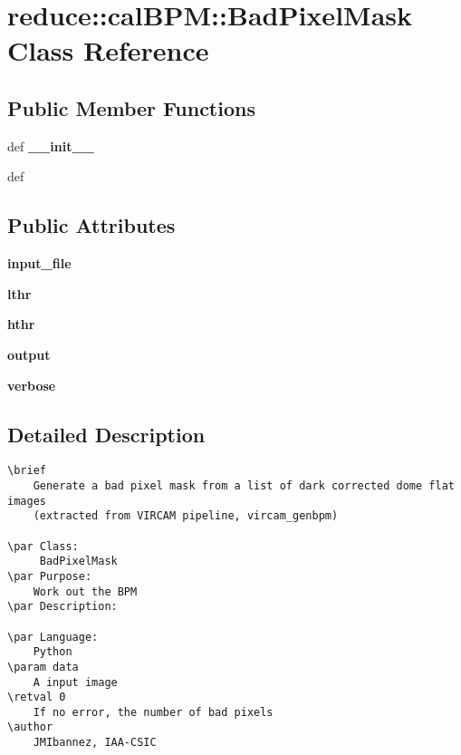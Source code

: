 \section{reduce::cal\-BPM::Bad\-Pixel\-Mask Class Reference}
\label{classreduce_1_1calBPM_1_1BadPixelMask}
\subsection*{Public Member Functions}
\begin{CompactItemize}
\item 
def \textbf{\_\-\_\-init\_\-\_\-}\label{classreduce_1_1calBPM_1_1BadPixelMask_b7185255dd70531237de52bb55bfcc3d}

\item 
def {\bfcreate}
\end{CompactItemize}
\subsection*{Public Attributes}
\begin{CompactItemize}
\item 
\textbf{input\_\-file}\label{classreduce_1_1calBPM_1_1BadPixelMask_6e2f4b0dcb52bc509362b0463f3e365c}

\item 
\textbf{lthr}\label{classreduce_1_1calBPM_1_1BadPixelMask_af5d8d61a4b3d668a6f5e0179cdc799f}

\item 
\textbf{hthr}\label{classreduce_1_1calBPM_1_1BadPixelMask_8d3b15c0996ad6a527efca5e1d6cc2e8}

\item 
\textbf{output}\label{classreduce_1_1calBPM_1_1BadPixelMask_246cdf1e061d8448b51d8ef1cac949b5}

\item 
\textbf{verbose}\label{classreduce_1_1calBPM_1_1BadPixelMask_c06c21611a01e52381caeaec7b9d7c84}

\end{CompactItemize}


\subsection{Detailed Description}


\footnotesize\begin{verbatim}
\brief 
    Generate a bad pixel mask from a list of dark corrected dome flat images
    (extracted from VIRCAM pipeline, vircam_genbpm)

\par Class:
     BadPixelMask   
\par Purpose:
    Work out the BPM
\par Description:
        
\par Language:
    Python
\param data
    A input image
\retval 0
    If no error, the number of bad pixels
\author
    JMIbannez, IAA-CSIC
    
\end{verbatim}
\normalsize
 



